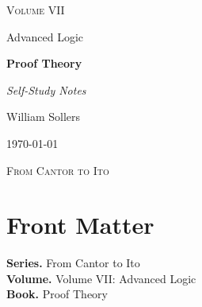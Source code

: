 \documentclass[12pt, a4paper]{report}
\begin{document}
\ExplSyntaxOff
\renewcommand{\familydefault}{\rmdefault}

\begin{titlepage}
\centering
\vspace*{3.5cm}

{\Large\scshape Volume VII\par}
\vspace{0.35cm}
{\large Advanced Logic\par}

\vspace{1.4cm}

{\Huge\bfseries Proof Theory\par}

\vspace{0.6cm}
{\large\itshape Self-Study Notes\par}

\vfill

{\large William Sollers\par}
\vspace{0.35cm}
{\large \today\par}

\vfill

{\large\scshape From Cantor to Ito\par}
\end{titlepage}

\clearpage
\thispagestyle{plain}
\chapter*{Front Matter}
\noindent\textbf{Series.} From Cantor to Ito\\[0.5em]
\textbf{Volume.} Volume VII: Advanced Logic\\[0.5em]
\textbf{Book.} Proof Theory

\clearpage
\tableofcontents
\clearpage
{}



\clearpage



\printindex[tech]
\printindex[dep]
\end{document}
